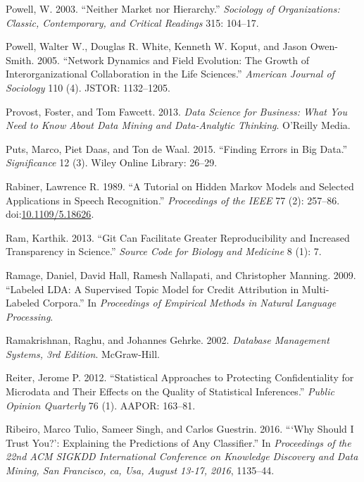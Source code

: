 \documentclass[]{krantz}
\begin{document}
\hypertarget{ref-powell2003neither}{}
Powell, W. 2003. ``Neither Market nor Hierarchy.'' \emph{Sociology of
Organizations: Classic, Contemporary, and Critical Readings} 315:
104--17.

\hypertarget{ref-powell2005network}{}
Powell, Walter W., Douglas R. White, Kenneth W. Koput, and Jason
Owen-Smith. 2005. ``Network Dynamics and Field Evolution: The Growth of
Interorganizational Collaboration in the Life Sciences.'' \emph{American
Journal of Sociology} 110 (4). JSTOR: 1132--1205.

\hypertarget{ref-FawcettProvost}{}
Provost, Foster, and Tom Fawcett. 2013. \emph{Data Science for Business:
What You Need to Know About Data Mining and Data-Analytic Thinking}.
O'Reilly Media.

\hypertarget{ref-puts2015finding}{}
Puts, Marco, Piet Daas, and Ton de Waal. 2015. ``Finding Errors in Big
Data.'' \emph{Significance} 12 (3). Wiley Online Library: 26--29.

\hypertarget{ref-rabiner-89}{}
Rabiner, Lawrence R. 1989. ``A Tutorial on Hidden Markov Models and
Selected Applications in Speech Recognition.'' \emph{Proceedings of the
IEEE} 77 (2): 257--86.
doi:\href{https://doi.org/10.1109/5.18626}{10.1109/5.18626}.

\hypertarget{ref-ram2013git}{}
Ram, Karthik. 2013. ``Git Can Facilitate Greater Reproducibility and
Increased Transparency in Science.'' \emph{Source Code for Biology and
Medicine} 8 (1): 7.

\hypertarget{ref-ramage-09}{}
Ramage, Daniel, David Hall, Ramesh Nallapati, and Christopher Manning.
2009. ``Labeled LDA: A Supervised Topic Model for Credit Attribution in
Multi-Labeled Corpora.'' In \emph{Proceedings of Empirical Methods in
Natural Language Processing}.

\hypertarget{ref-ramakrishnan2000database}{}
Ramakrishnan, Raghu, and Johannes Gehrke. 2002. \emph{Database
Management Systems, 3rd Edition}. McGraw-Hill.

\hypertarget{ref-reiter2012statistical}{}
Reiter, Jerome P. 2012. ``Statistical Approaches to Protecting
Confidentiality for Microdata and Their Effects on the Quality of
Statistical Inferences.'' \emph{Public Opinion Quarterly} 76 (1). AAPOR:
163--81.

\hypertarget{ref-ribeiro-16}{}
Ribeiro, Marco Tulio, Sameer Singh, and Carlos Guestrin. 2016. ```Why
Should I Trust You?': Explaining the Predictions of Any Classifier.'' In
\emph{Proceedings of the 22nd ACM SIGKDD International Conference on
Knowledge Discovery and Data Mining, San Francisco, ca, Usa, August
13-17, 2016}, 1135--44.
\end{document}
